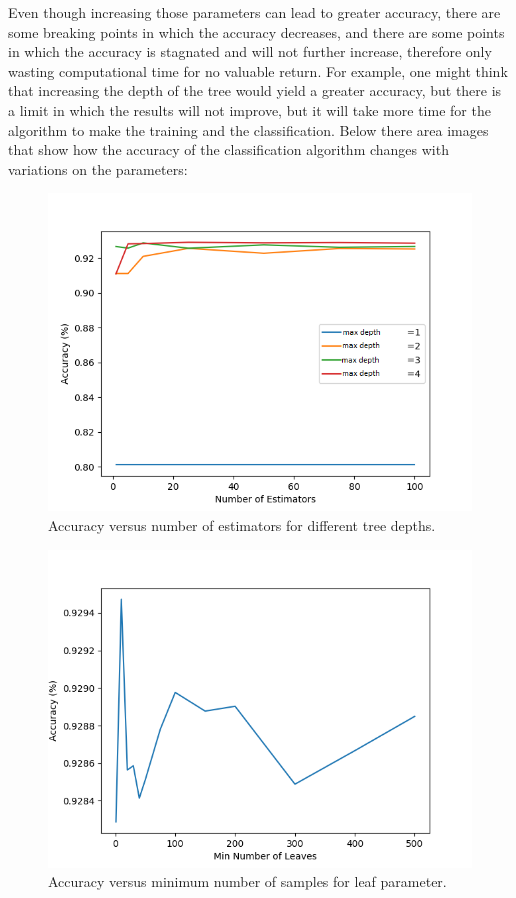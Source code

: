 Even though increasing those parameters can lead to greater accuracy, there are some breaking points in which the accuracy decreases, and there are some points in which the accuracy is stagnated and will not further increase, therefore only wasting computational time for no valuable return. For example, one might think that increasing the depth of the tree would yield a greater accuracy, but there is a limit in which the results will not improve, but it will take more time for the algorithm to make the training and the classification.
Below there area images that show how the accuracy of the classification algorithm changes with variations on the parameters:
\begin{figure}[H]
    \centering
    \includegraphics[width=\linewidth]{Chapter5/Number_of_estimators.png}
    \caption{Accuracy versus number of estimators for different tree depths.}
    \label{fig:num_estimators}
\end{figure}{}

\begin{figure}[H]
    \centering
    \includegraphics[width=\linewidth]{Chapter5/number_of_leaves.png}
    \caption{Accuracy versus minimum number of samples for leaf parameter.}
    \label{fig:num_leaves}
\end{figure}{}
